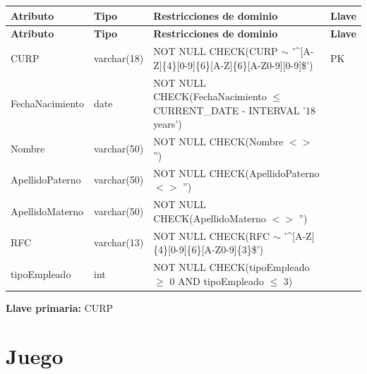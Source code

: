\documentclass[12pt]{article}
\begin{document}
\begin{longtable}{p{3.5cm} p{2.5cm} p{7.5cm} p{1.5cm}}
\label{tab:empleado}\\
\toprule
\textbf{Atributo} & \textbf{Tipo} & \textbf{Restricciones de dominio} & \textbf{Llave} \\
\midrule
\endfirsthead

\toprule
\textbf{Atributo} & \textbf{Tipo} & \textbf{Restricciones de dominio} & \textbf{Llave} \\
\midrule
\endhead
\bottomrule
\endfoot

CURP 
& varchar(18) 
& NOT NULL \newline CHECK(CURP $\sim$ '\^{}[A-Z]\{4\}[0-9]\{6\}[A-Z]\{6\}[A-Z0-9][0-9]\$')
& PK \\

FechaNacimiento 
& date 
& NOT NULL \newline CHECK(FechaNacimiento $\leq$ CURRENT\_DATE - INTERVAL '18 years')
& \\

Nombre 
& varchar(50)
& NOT NULL \newline CHECK(Nombre $<>$ '')
& \\

ApellidoPaterno 
& varchar(50) 
& NOT NULL \newline CHECK(ApellidoPaterno $<>$ '')
& \\

ApellidoMaterno 
& varchar(50) 
& NOT NULL \newline CHECK(ApellidoMaterno $<>$ '')
& \\

RFC 
& varchar(13) 
& NOT NULL \newline CHECK(RFC $\sim$ '\^{}[A-Z]\{4\}[0-9]\{6\}[A-Z0-9]\{3\}\$')
& \\

tipoEmpleado
& int
& NOT NULL \newline CHECK(tipoEmpleado $\geq$ 0 AND tipoEmpleado $\leq$ 3)
& \\

\end{longtable}

\vspace{2pt}
\textbf{Llave primaria:} CURP\\


\section*{Juego}
\end{document}
